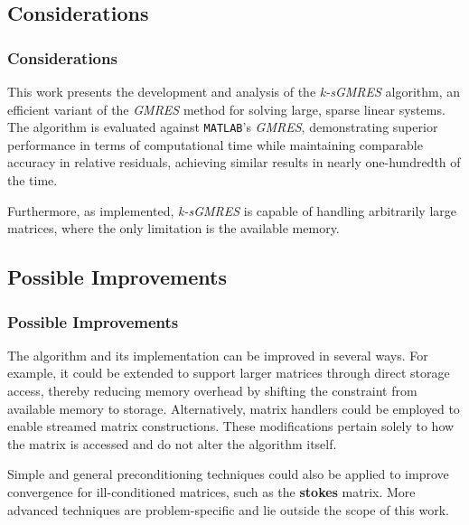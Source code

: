 \subsection{Considerations}

\begin{frame}
    \frametitle{Considerations}

    This work presents the development and analysis of the \textit{k-sGMRES} algorithm, an efficient variant of the \textit{GMRES} method for solving large, sparse linear systems. The algorithm is evaluated against \lstinline{MATLAB}'s \textit{GMRES}, demonstrating superior performance in terms of computational time while maintaining comparable accuracy in relative residuals, achieving similar results in nearly one-hundredth of the time. 

    Furthermore, as implemented, \textit{k-sGMRES} is capable of handling arbitrarily large matrices, where the only limitation is the available memory.
\end{frame}

\subsection{Possible Improvements}

\begin{frame}
    \frametitle{Possible Improvements}

    The algorithm and its implementation can be improved in several ways. For example, it could be extended to support larger matrices through direct storage access, thereby reducing memory overhead by shifting the constraint from available memory to storage. Alternatively, matrix handlers could be employed to enable streamed matrix constructions. These modifications pertain solely to how the matrix is accessed and do not alter the algorithm itself.

    \vspace{1em}
    Simple and general preconditioning techniques could also be applied to improve convergence for ill-conditioned matrices, such as the \textbf{stokes} matrix. More advanced techniques are problem-specific and lie outside the scope of this work.
\end{frame}